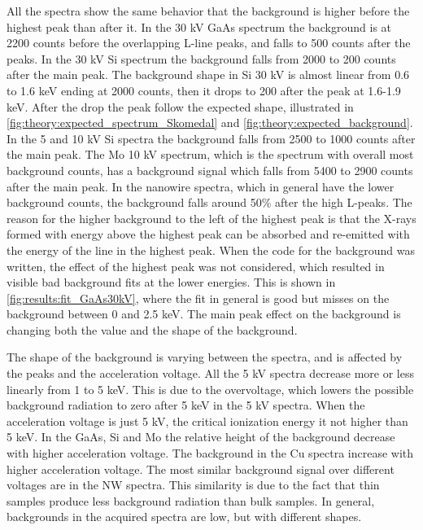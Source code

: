 All the spectra show the same behavior that the background is higher before the highest peak than after it.
In the 30 kV GaAs spectrum the background is at 2200 counts before the overlapping L-line peaks, and falls to 500 counts after the peaks.
In the 30 kV Si spectrum the background falls from 2000 to 200 counts after the main peak.
The background shape in Si 30 kV is almost linear from 0.6 to 1.6 keV ending at 2000 counts, then it drops to 200 after the peak at 1.6-1.9 keV.
After the drop the peak follow the expected shape, illustrated in \cref{fig:theory:expected_spectrum_Skomedal} and \cref{fig:theory:expected_background}.
In the 5 and 10 kV Si spectra the background falls from 2500 to 1000 counts after the main peak.
The Mo 10 kV spectrum, which is the spectrum with overall most background counts, has a background signal which falls from 5400 to 2900 counts after the main peak.
In the nanowire spectra, which in general have the lower background counts, the background falls around 50\% after the high L-peaks.
The reason for the higher background to the left of the highest peak is that the X-rays formed with energy above the highest peak can be absorbed and re-emitted with the energy of the line in the highest peak.
When the code for the background was written, the effect of the highest peak was not considered, which resulted in visible bad background fits at the lower energies.
This is shown in \cref{fig:results:fit_GaAs30kV}, where the fit in general is good but misses on the background between 0 and 2.5 keV.
The main peak effect on the background is changing both the value and the shape of the background.


The shape of the background is varying between the spectra, and is affected by the peaks and the acceleration voltage.
All the 5 kV spectra decrease more or less linearly from 1 to 5 keV.
This is due to the overvoltage, which lowers the possible background radiation to zero after 5 keV in the 5 kV spectra.
When the acceleration voltage is just 5 kV, the critical ionization energy it not higher than 5 keV.
In the GaAs, Si and Mo the relative height of the background decrease with higher acceleration voltage.
The background in the Cu spectra increase with higher acceleration voltage.
The most similar background signal over different voltages are in the NW spectra. %
This similarity is due to the fact that thin samples produce less background radiation than bulk samples.
In general, backgrounds in the acquired spectra are low, but with different shapes.



